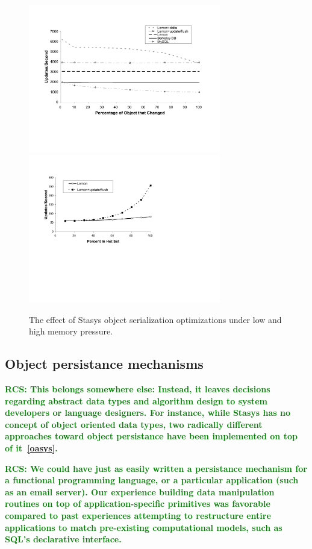 \documentclass[letterpaper,twocolumn,10pt]{article}
\newcommand{\yad}{Stasys\xspace}
\newcommand{\rcs}[1]{\textcolor{green}{\bf RCS: #1}}
\begin{document}
\begin{figure}[t!]
\includegraphics[width=3.3in]{figs/object-diff.pdf}
\hspace{.3in}
\includegraphics[width=3.3in]{figs/mem-pressure.pdf}
\vspace{-.15in}
\caption{\sf \label{fig:OASYS}
The effect of \yad object serialization optimizations under low and high memory pressure.}
\end{figure}

\subsection{Object persistance mechanisms}
\rcs{ This belongs somewhere else: Instead, it leaves decisions regarding abstract data types and
algorithm design to system developers or language designers.  For
instance, while \yad has no concept of object oriented data types, two
radically different approaches toward object persistance have been
implemented on top of it~\ref{oasys}.}

\rcs{We could have just as easily written a persistance mechanism for a
functional programming language, or a particular application (such as
an email server).  Our experience building data manipulation routines
on top of application-specific primitives was favorable compared to
past experiences attempting to restructure entire applications to
match pre-existing computational models, such as SQL's declarative
interface.}
\end{document}
